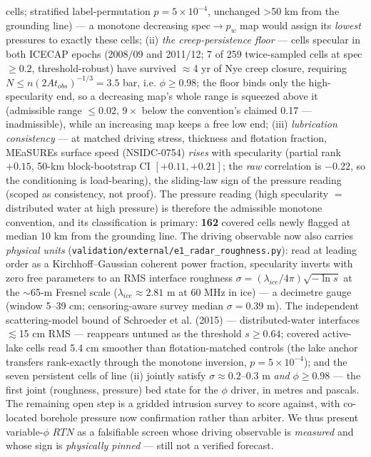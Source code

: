 \documentclass[tc, manuscript]{copernicus}
\begin{document}
cells; stratified label-permutation $p=5\times 10^{-4}$, unchanged >50 km from the grounding line) — a monotone decreasing spec$\to p_{w}$ map would assign its \emph{lowest} pressures to exactly these cells; (ii) \emph{the creep-persistence floor} — cells specular in both ICECAP epochs (2008/09 and 2011/12; 7 of 259 twice-sampled cells at spec $\ge 0.2$, threshold-robust) have survived $\approx $4 yr of Nye creep closure, requiring $N\le n(2At_{obs})^{-1/3}=3.5$ bar, i.e. $\phi \ge 0.98$; the floor binds only the high-specularity end, so a decreasing map's whole range is squeezed above it (admissible range $\le 0.02$, $9\times $ below the convention's claimed 0.17 — inadmissible), while an increasing map keeps a free low end; (iii) \emph{lubrication consistency} — at matched driving stress, thickness and flotation fraction, MEaSUREs surface speed (NSIDC-0754) \emph{rises} with specularity (partial rank $+0.15$, 50-km block-bootstrap CI $[+0.11,+0.21]$; the \emph{raw} correlation is $-0.22$, so the conditioning is load-bearing), the sliding-law sign of the pressure reading (scoped as consistency, not proof). The pressure reading (high specularity $=$ distributed water at high pressure) is therefore the admissible monotone convention, and its classification is primary: \textbf{162} covered cells newly flagged at median 10 km from the grounding line. The driving observable now also carries \emph{physical units} (\texttt{validation/\allowbreak{}external/\allowbreak{}e1\_\allowbreak{}radar\_\allowbreak{}roughness.\allowbreak{}py}): read at leading order as a Kirchhoff--Gaussian coherent power fraction, specularity inverts with zero free parameters to an RMS interface roughness $\sigma =(\lambda _{ice}/4\pi )\sqrt{-\ln s}$ at the $\sim $65-m Fresnel scale ($\lambda _{ice}\approx 2.81$ m at 60 MHz in ice) — a decimetre gauge (window 5--39 cm; censoring-aware survey median $\sigma =0.39$ m). The independent scattering-model bound of Schroeder et al. (2015) — distributed-water interfaces $\lesssim $15 cm RMS — reappears untuned as the threshold $s\ge 0.64$; covered active-lake cells read 5.4 cm smoother than flotation-matched controls (the lake anchor transfers rank-exactly through the monotone inversion, $p=5\times 10^{-4}$); and the seven persistent cells of line (ii) jointly satisfy $\sigma \approx 0.2$--$0.3$ m \emph{and} $\phi \ge 0.98$ — the first joint (roughness, pressure) bed state for the $\phi $ driver, in metres and pascals. The remaining open step is a gridded intrusion survey to score against, with co-located borehole pressure now confirmation rather than arbiter. We thus present variable-$\phi $ $RTN$ as a falsifiable screen whose driving observable is \emph{measured} and whose sign is \emph{physically pinned} — still not a verified forecast.
\end{document}
